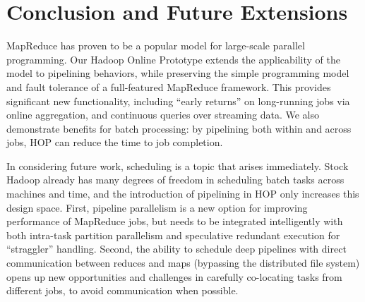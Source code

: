 \chapter[Conclusion and Future Extensions]{Conclusion and Future Extensions}
\label{ch:conclusion}

MapReduce has proven to be a popular model for large-scale parallel programming. Our Hadoop Online Prototype extends the applicability of the model to pipelining behaviors, while preserving the simple programming model and fault tolerance of a full-featured MapReduce framework.  This provides significant new functionality, including ``early returns'' on long-running jobs via online aggregation, and continuous queries over streaming data.  We also demonstrate benefits for batch processing:  by pipelining both within and across jobs, HOP can 
reduce the time to job completion. 

In considering future work, scheduling is a topic that arises immediately.
Stock Hadoop already has many degrees of freedom in scheduling batch tasks across machines and time, and the introduction of pipelining in HOP only increases this design space.  First, pipeline parallelism is a new option for improving performance of MapReduce jobs, but needs to be integrated intelligently with both intra-task partition parallelism and speculative redundant execution for ``straggler'' handling.
Second, the ability to schedule deep pipelines with direct
communication between reduces and maps (bypassing the distributed file
system) opens up new opportunities and challenges in carefully co-locating tasks from different jobs, to avoid communication when possible.  

